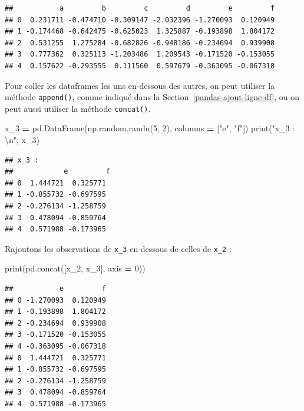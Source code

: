 \documentclass[12pt,]{book}
\newenvironment{Shaded}{\begin{snugshade}}{\end{snugshade}}
\newcommand{\DecValTok}[1]{\textcolor[rgb]{0.00,0.00,0.81}{#1}}
\newcommand{\CharTok}[1]{\textcolor[rgb]{0.31,0.60,0.02}{#1}}
\newcommand{\StringTok}[1]{\textcolor[rgb]{0.31,0.60,0.02}{#1}}
\newcommand{\OperatorTok}[1]{\textcolor[rgb]{0.81,0.36,0.00}{\textbf{#1}}}
\newcommand{\BuiltInTok}[1]{#1}
\newcommand{\NormalTok}[1]{#1}
\numberwithin{equation}{section}
\numberwithin{countremarque}{section}
\begin{document}
\begin{lstlisting}
##           a         b         c         d         e         f
## 0  0.231711 -0.474710 -0.309147 -2.032396 -1.270093  0.120949
## 1 -0.174468 -0.642475 -0.625023  1.325887 -0.193898  1.804172
## 2  0.531255  1.275284 -0.682826 -0.948186 -0.234694  0.939908
## 3  0.777362  0.325113 -1.203486  1.209543 -0.171520 -0.153055
## 4  0.157622 -0.293555  0.111560  0.597679 -0.363095 -0.067318
\end{lstlisting}

Pour coller les dataframes les uns en-dessous des autres, on peut
utiliser la méthode \texttt{append()}, comme indiqué dans la
Section~\ref{pandas-ajout-ligne-df}, ou on peut aussi utiliser la
méthode \texttt{concat()}.

\begin{Shaded}
\begin{Highlighting}[]
\NormalTok{x_3 }\OperatorTok{=}\NormalTok{ pd.DataFrame(np.random.randn(}\DecValTok{5}\NormalTok{, }\DecValTok{2}\NormalTok{),}
\NormalTok{                   columns }\OperatorTok{=}\NormalTok{ [}\StringTok{"e"}\NormalTok{, }\StringTok{"f"}\NormalTok{])}
\BuiltInTok{print}\NormalTok{(}\StringTok{"x_3 : }\CharTok{\textbackslash{}n}\StringTok{"}\NormalTok{, x_3)}
\end{Highlighting}
\end{Shaded}

\begin{lstlisting}
## x_3 : 
##            e         f
## 0  1.444721  0.325771
## 1 -0.855732 -0.697595
## 2 -0.276134 -1.258759
## 3  0.478094 -0.859764
## 4  0.571988 -0.173965
\end{lstlisting}

Rajoutons les observations de \texttt{x\_3} en-dessous de celles de
\texttt{x\_2} :

\begin{Shaded}
\begin{Highlighting}[]
\BuiltInTok{print}\NormalTok{(pd.concat([x_2, x_3], axis }\OperatorTok{=} \DecValTok{0}\NormalTok{))}
\end{Highlighting}
\end{Shaded}

\begin{lstlisting}
##           e         f
## 0 -1.270093  0.120949
## 1 -0.193898  1.804172
## 2 -0.234694  0.939908
## 3 -0.171520 -0.153055
## 4 -0.363095 -0.067318
## 0  1.444721  0.325771
## 1 -0.855732 -0.697595
## 2 -0.276134 -1.258759
## 3  0.478094 -0.859764
## 4  0.571988 -0.173965
\end{lstlisting}
\end{document}
